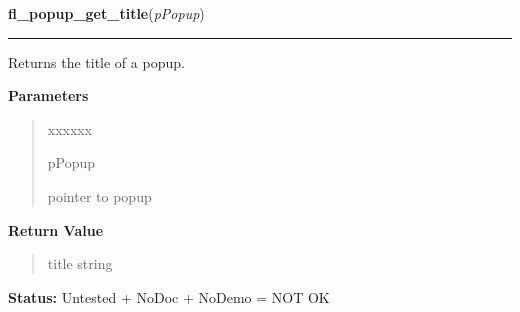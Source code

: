 \hspace{.8\funcindent}\begin{boxedminipage}{\funcwidth}

    \raggedright \textbf{fl\_popup\_get\_title}(\textit{pPopup})

    \vspace{-1.5ex}

    \rule{\textwidth}{0.5\fboxrule}
\setlength{\parskip}{2ex}
    Returns the title of a popup.

\setlength{\parskip}{1ex}
      \textbf{Parameters}
      \vspace{-1ex}

      \begin{quote}
        \begin{Ventry}{xxxxxx}

          \item[pPopup]

          pointer to popup

        \end{Ventry}

      \end{quote}

      \textbf{Return Value}
    \vspace{-1ex}

      \begin{quote}
      title string

      \end{quote}

\textbf{Status:} Untested + NoDoc + NoDemo = NOT OK



    \end{boxedminipage}

    \label{xformslib:library:fl_popup_set_title}

    \vspace{0.5ex}

